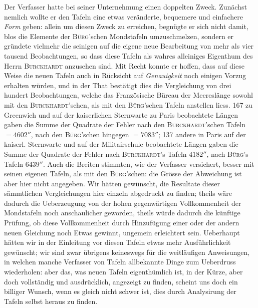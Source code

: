 Der Verfasser hatte bei seiner Unternehmung einen doppelten Zweck. Zunächst nemlich wollte er den Tafeln eine etwas veränderte, bequemere und einfachere \emph{Form} geben: allein um diesen Zweck zu erreichen, begnügte er sich nicht damit, blos die Elemente der \textsc{Bürg}'schen Mondstafeln umzuschmelzen, sondern er gründete vielmehr die seinigen auf die eigene neue Bearbeitung von mehr als vier tausend Beobachtungen, so dass diese Tafeln als wahres alleiniges Eigenthum des Herrn \textsc{Burckhardt} anzusehen sind. Mit Recht konnte er hoffen, dass auf diese Weise die neuen Tafeln auch in Rücksicht auf \emph{Genauigkeit} noch einigen Vorzug erhalten würden, und in der That bestätigt dies die Vergleichung von drei hundert Beobachtungen, welche das Französische Büreau der Meereslänge sowohl mit den \textsc{Burckhardt}'schen, als mit den \textsc{Bürg}'schen Tafeln anstellen liess. 167 zu Greenwich und auf der kaiserlichen Sternwarte zu Paris beobachtete Längen gaben die Summe der Quadrate der Fehler nach den \textsc{Burckhardt}'schen Tafeln $= 4602''$, nach den \textsc{Bürg}'schen hingegen $= 7083''$; 137 andere in Paris auf der kaiserl. Sternwarte und auf der Militairschule beobachtete Längen gaben die Summe der Quadrate der Fehler nach \textsc{Burckhardt}'s Tafeln $4182''$, nach \textsc{Bürg}'s Tafeln $6439''$. Auch die Breiten stimmten, wie der Verfasser versichert, besser mit seinen eigenen Tafeln, als mit den \textsc{Bürg}'schen: die Grösse der Abweichung ist aber hier nicht angegeben. Wir hätten gewünscht, die Resultate dieser sämmtlichen Vergleichungen hier einzeln abgedruckt zu finden; theils wäre dadurch die Ueberzeugung von der hohen gegenwärtigen Vollkommenheit der Mondstafeln noch anschaulicher geworden, theils würde dadurch die künftige Prüfung, ob diese Vollkommenheit durch Hinzufügung einer oder der andern neuen Gleichung noch Etwas gewinnt, ungemein erleichtert sein. Ueberhaupt hätten wir in der Einleitung vor diesen Tafeln etwas mehr Ausführlichkeit gewünscht; wir sind zwar übrigens keineswegs für die weitläufigen Anweisungen, in welchen manche Verfasser von Tafeln allbekannte Dinge zum Ueberdruss wiederholen: aber das, was neuen Tafeln eigenthümlich ist, in der Kürze, aber doch vollständig und ausdrücklich, angezeigt zu finden, scheint uns doch ein billiger Wunsch, wenn es gleich nicht schwer ist, dies durch Analysirung der Tafeln selbst heraus zu finden.

